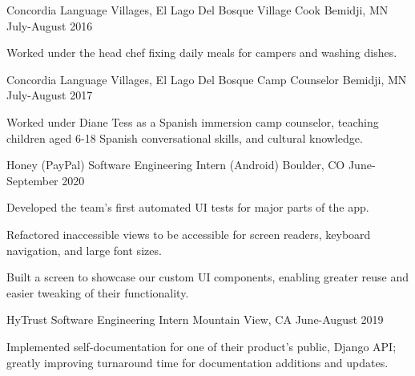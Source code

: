 \documentclass[12pt, a4paper]{awesome-cv}
\begin{document}
\begin{cventries}
\cventry
  {Concordia Language Villages, El Lago Del Bosque}
  {Village Cook}
  {Bemidji, MN}
  {July-August 2016}
  {
    \begin{cvitems}
      \item {Worked under the head chef fixing daily meals for campers and
    washing dishes.}
    \end{cvitems}
  }

  \cventry
    {Concordia Language Villages, El Lago Del Bosque}
    {Camp Counselor}
    {Bemidji, MN}
    {July-August 2017}
    {
      \begin{cvitems}
        \item {Worked under Diane Tess as a Spanish immersion camp counselor, teaching children aged 6-18 Spanish conversational skills, and cultural knowledge.}
      \end{cvitems}
    }


  \cventry
    {Honey (PayPal)}
    {Software Engineering Intern (Android)}
    {Boulder, CO}
    {June-September 2020}
    {
        \begin{cvitems}
            \item {Developed the team's first automated UI tests for major parts of the app.}
            \item {Refactored inaccessible views to be accessible for screen readers, keyboard navigation, and large font sizes.}
            \item {Built a screen to showcase our custom UI components, enabling greater reuse and easier tweaking of their functionality.}
        \end{cvitems}
    }

  \cventry
    {HyTrust}
    {Software Engineering Intern}
    {Mountain View, CA}
    {June-August 2019}
    {
      \begin{cvitems}
	\item {Implemented self-documentation for one of their product's public, Django API; greatly improving turnaround time for documentation additions and updates.}
      \end{cvitems}
    }



\end{cventries}
\end{document}
